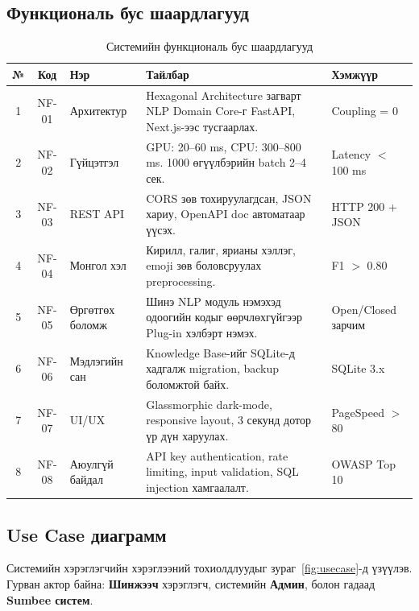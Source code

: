 \subsection{Функциональ бус шаардлагууд}

\begin{table}[h!]
\centering
\renewcommand{\arraystretch}{1.5}
\begin{tabular}{|c|c|p{2.2cm}|p{5.5cm}|p{2.5cm}|}
\hline
\textbf{№} & \textbf{Код} & \textbf{Нэр} & \textbf{Тайлбар} & \textbf{Хэмжүүр} \\ \hline
1 & NF-01 & Архитектур & Hexagonal Architecture загварт NLP Domain Core-г FastAPI, Next.js-ээс тусгаарлах. & Coupling = 0 \\ \hline
2 & NF-02 & Гүйцэтгэл & GPU: 20--60 ms, CPU: 300--800 ms. 1000 өгүүлбэрийн batch 2--4 сек. & Latency $<$ 100 ms \\ \hline
3 & NF-03 & REST API & CORS зөв тохируулагдсан, JSON хариу, OpenAPI doc автоматаар үүсэх. & HTTP 200 + JSON \\ \hline
4 & NF-04 & Монгол хэл & Кирилл, галиг, ярианы хэллэг, emoji зөв боловсруулах preprocessing. & F1 $>$ 0.80 \\ \hline
5 & NF-05 & Өргөтгөх боломж & Шинэ NLP модуль нэмэхэд одоогийн кодыг өөрчлөхгүйгээр Plug-in хэлбэрт нэмэх. & Open/Closed зарчим \\ \hline
6 & NF-06 & Мэдлэгийн сан & Knowledge Base-ийг SQLite-д хадгалж migration, backup боломжтой байх. & SQLite 3.x \\ \hline
7 & NF-07 & UI/UX & Glassmorphic dark-mode, responsive layout, 3 секунд дотор үр дүн харуулах. & PageSpeed $>$ 80 \\ \hline
8 & NF-08 & Аюулгүй байдал & API key authentication, rate limiting, input validation, SQL injection хамгаалалт. & OWASP Top 10 \\ \hline
\end{tabular}
\caption{Системийн функциональ бус шаардлагууд}
\label{tab:nonfunctional_req}
\end{table}

\subsection{Use Case диаграмм}

Системийн хэрэглэгчийн хэрэглээний тохиолдлуудыг зураг~\ref{fig:usecase}-д үзүүлэв. Гурван актор байна: \textbf{Шинжээч} хэрэглэгч, системийн \textbf{Админ}, болон гадаад \textbf{Sumbee систем}.

